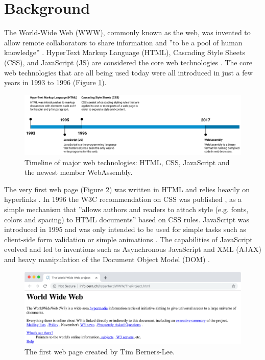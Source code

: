 \section{Background}
\label{background}

The World-Wide Web (WWW), commonly known as the web, was invented to allow remote collaborators to share information and ''to be a pool of human knowledge'' \parencite[76]{BernersLeeCailliauLuotonenNielsenSecret1994}. HyperText Markup Language (HTML), Cascading Style Sheets (CSS), and JavaScript (JS) are considered the core web technologies \parencite{MajchrzakBiornHansenGronli2018}. The core web technologies that are all being used today were all introduced in just a few years in 1993 to 1996 (Figure \ref{webtechnologies-timeline}).

\begin{figure}[!h]
\centering
    \includegraphics[width=16cm,keepaspectratio]{figures/webtechnologies-timeline}
\caption{Timeline of major web technologies: HTML, CSS, JavaScript and the newest member WebAssembly.}
\label{webtechnologies-timeline}
\end{figure}

The very first web page (Figure \ref{world-wide-web}) was written in HTML and relies heavily on hyperlinks \parencite{BernersLeeCailliauGroffPollermann1992}. In 1996 the W3C recommendation on CSS was published \parencite{LieBos1996}, as a simple mechanism that ''allows authors and readers to attach style (e.g. fonts, colors and spacing) to HTML documents'' \parencite*[1]{LieBos1996} based on CSS rules. JavaScript was introduced in 1995 and was only intended to be used for simple tasks such as client-side form validation or simple animations \parencite{Moller2018}. The capabilities of JavaScript evolved and led to inventions such as Asynchronous JavaScript and XML (AJAX) \parencite{NielsonWilliamsonArlitt2008} and heavy manipulation of the Document Object Model (DOM) \parencite{WoodLeHorsApparaoByrneChampionIsaacsJacobsNicolRobieSutor1998}.

\begin{figure}[!h]
\centering
\includegraphics[width=16cm,keepaspectratio]{figures/world-wide-web}
\caption{The first web page created by Tim Berners-Lee.}
\label{world-wide-web}
\end{figure}

